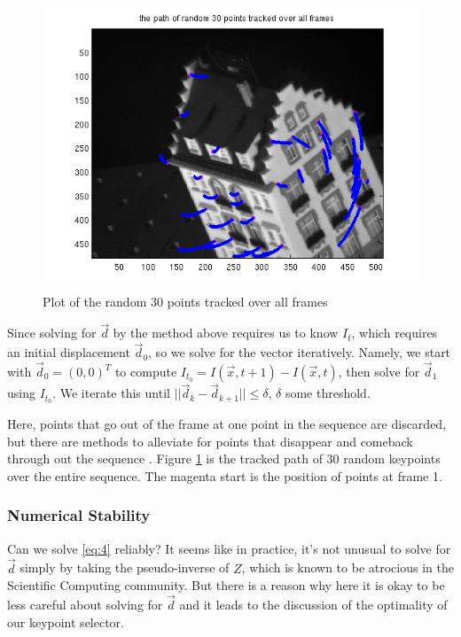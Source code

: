 \begin{figure}[!ht]
  \begin{center}
  \includegraphics[scale=0.75]{tracked.png}
  \caption{Plot of the random 30 points tracked over all frames} 
  \label{fig:track}
  \end{center}
\end{figure}
Since solving for $\vec d$ by the method above requires us to know
$I_t$, which requires an initial displacement $\vec d_0$, so we solve
for the vector iteratively. Namely, we start with $\vec d_0
=(0,0)^T$ to compute $I_{t_0} = I(\vec x, t+1) - I(\vec x, t)$, then
solve for $\vec d_1$ using $I_{t_0}$. We iterate this until $||\vec
d_k - \vec d_{k+1}|| \le \delta$, $\delta$ some threshold.

Here, points that go out of the frame at one point in the sequence are discarded, but there are
methods to alleviate for points that disappear and comeback through
out the sequence \cite{Morita}. 
Figure \ref{fig:track} is the tracked path of 30 random keypoints over
the entire sequence. The magenta start is the position of points at frame 1.

\subsubsection{Numerical Stability}
\label{sec:numerical-stability}
Can we solve \eqref{eq:4} reliably? It seems like in practice, it's
not unusual to solve for $\vec d$ simply by taking the pseudo-inverse of $Z$,
which is known to be atrocious in the Scientific Computing
community. But there is a reason why here it is okay to be less
careful about solving for $\vec d$ and it leads to the discussion of
the optimality of our keypoint selector.

